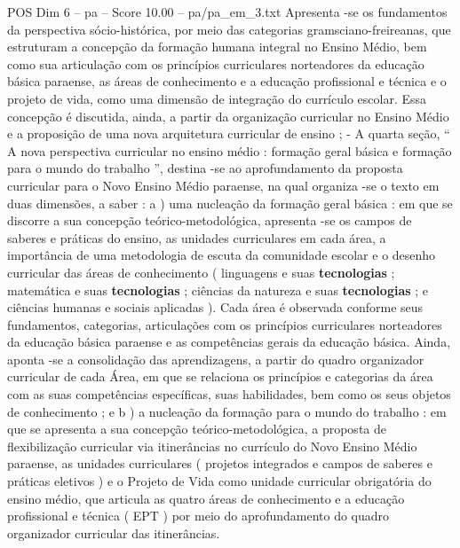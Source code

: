 \begin{textsample}{POS Dim 6 – pa – Score 10.00 – pa/pa\_em\_3.txt}
Apresenta -se os fundamentos da perspectiva sócio-histórica, por meio das categorias gramsciano-freireanas, que estruturam a concepção da formação humana integral no Ensino Médio, bem como sua articulação com os princípios curriculares norteadores da educação básica paraense, as áreas de conhecimento e a educação profissional e técnica e o projeto de vida, como uma dimensão de integração do currículo escolar.
Essa concepção é discutida, ainda, a partir da organização curricular no Ensino Médio e a proposição de uma nova arquitetura curricular de ensino ; - A quarta seção, “ A nova perspectiva curricular no ensino médio : formação geral básica e formação para o mundo do trabalho ”, destina -se ao aprofundamento da proposta curricular para o Novo Ensino Médio paraense, na qual organiza -se o texto em duas dimensões, a saber : a ) uma nucleação da formação geral básica : em que se discorre a sua concepção teórico-metodológica, apresenta -se os campos de saberes e práticas do ensino, as unidades curriculares em cada área, a importância de uma metodologia de escuta da comunidade escolar e o desenho curricular das áreas de conhecimento ( linguagens e suas \textbf{tecnologias} ; matemática e suas \textbf{tecnologias} ; ciências da natureza e suas \textbf{tecnologias} ; e ciências humanas e sociais aplicadas ).
Cada área é observada conforme seus fundamentos, categorias, articulações com os princípios curriculares norteadores da educação básica paraense e as competências gerais da educação básica.
Ainda, aponta -se a consolidação das aprendizagens, a partir do quadro organizador curricular de cada Área, em que se relaciona os princípios e categorias da área com as suas competências específicas, suas habilidades, bem como os seus objetos de conhecimento ; e b ) a nucleação da formação para o mundo do trabalho : em que se apresenta a sua concepção teórico-metodológica, a proposta de flexibilização curricular via itinerâncias no currículo do Novo Ensino Médio paraense, as unidades curriculares ( projetos integrados e campos de saberes e práticas eletivos ) e o Projeto de Vida como unidade curricular obrigatória do ensino médio, que articula as quatro áreas de conhecimento e a educação profissional e técnica ( EPT ) por meio do aprofundamento do quadro organizador curricular das itinerâncias.

\end{textsample}
